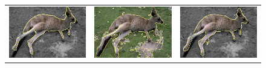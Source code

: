 \documentclass[smallextended]{svjour3}       %
\begin{document}
{{\begin{figure}[hp!]
\begin{tabular}{ccc}
		\includegraphics[scale=0.2]{images/segmentation/bc/canguru/gc-seg.png} &
		\includegraphics[scale=0.2]{images/segmentation/schoenemann/canguru/canguru-seg.png} &
		\includegraphics[scale=0.2]{images/segmentation/bc/canguru/corrected-seg.png} \\		

\end{tabular}
\end{figure}}}
\end{document}
